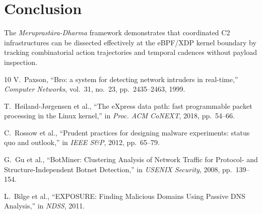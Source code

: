 \documentclass[10pt,twocolumn]{article}
\begin{document}
\section{Conclusion}
The \textit{Meruprast\={a}ra-Dharma} framework demonstrates that coordinated C2 infrastructures can be dissected effectively at the eBPF/XDP kernel boundary by tracking combinatorial action trajectories and temporal cadences without payload inspection.

\begin{thebibliography}{10}
V.~Paxson, ``Bro: a system for detecting network intruders in real-time,'' \emph{Computer Networks}, vol.~31, no.~23, pp.~2435--2463, 1999.

T.~H{\o}iland-J{\o}rgensen et al., ``The eXpress data path: fast programmable packet processing in the Linux kernel,'' in \emph{Proc. ACM CoNEXT}, 2018, pp.~54--66.

C.~Rossow et al., ``Prudent practices for designing malware experiments: status quo and outlook,'' in \emph{IEEE S\&P}, 2012, pp.~65--79.

G.~Gu et al., ``BotMiner: Clustering Analysis of Network Traffic for Protocol- and Structure-Independent Botnet Detection,'' in \emph{USENIX Security}, 2008, pp.~139--154.

L.~Bilge et al., ``EXPOSURE: Finding Malicious Domains Using Passive DNS Analysis,'' in \emph{NDSS}, 2011.
\end{thebibliography}
\end{document}
